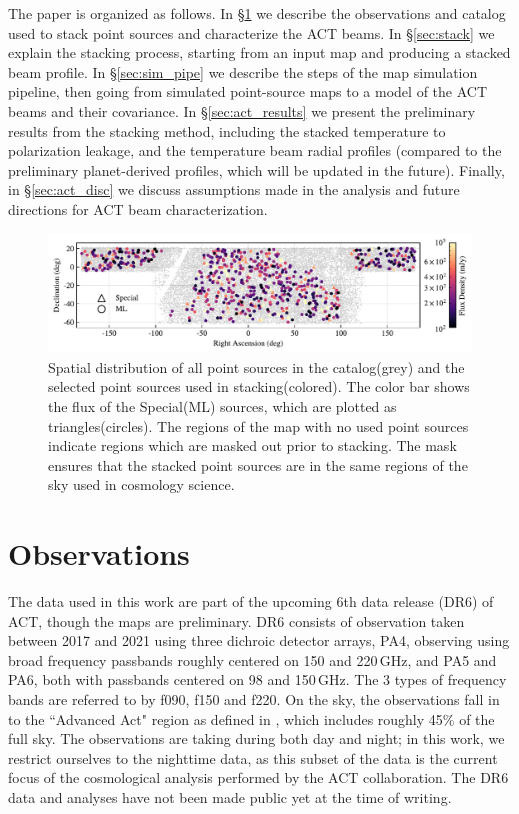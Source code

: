 The paper is organized as follows.  In \S\ref{sec:observations} we describe the observations and catalog used to stack point sources and characterize the ACT beams.  In \S\ref{sec:stack} we explain the stacking process, starting from an input map and producing a stacked beam profile.  In \S\ref{sec:sim_pipe} we describe the steps of the map simulation pipeline, then going from simulated point-source maps to a model of the ACT beams and their covariance.  In \S\ref{sec:act_results} we present the preliminary results from the stacking method, including the stacked temperature to polarization leakage, and the temperature beam radial profiles (compared to the preliminary planet-derived profiles, which will be updated in the future).  Finally, in \S\ref{sec:act_disc} we discuss assumptions made in the analysis and future directions for ACT beam characterization.

\begin{figure}[t]
    \centering
    \includegraphics[width = \textwidth]{Figures/flux_map.pdf}
    \caption{Spatial distribution of all point sources in the catalog(grey) and the selected point sources used in stacking(colored).  The color bar shows the flux of the Special(ML) sources, which are plotted as triangles(circles).  The regions of the map with no used point sources indicate regions which are masked out prior to stacking.  The mask ensures that the stacked point sources are in the same regions of the sky used in cosmology science.}
    \label{fig:ptsrc_map}
\end{figure}

\section{Observations}
\label{sec:observations}
The  data used in this work are part of the upcoming 6th data release (DR6) of ACT, though the maps are preliminary. DR6 consists of observation taken between 2017 and 2021 using three dichroic detector arrays, PA4, observing using broad frequency passbands roughly centered on  150 and 220\,GHz, and PA5 and PA6, both with passbands centered on 98 and 150\,GHz. The 3 types of frequency bands are referred to by f090, f150 and f220. On the sky, the observations fall in to the ``Advanced Act" region as defined in \cite{aiola_2020}, which includes roughly 45\% of the full sky. The observations are taking during both day and night; in this work, we restrict ourselves to the nighttime data, as this subset of the data is the current focus of the cosmological analysis performed by the ACT collaboration. The DR6 data and analyses have not been made public yet at the time of writing.

